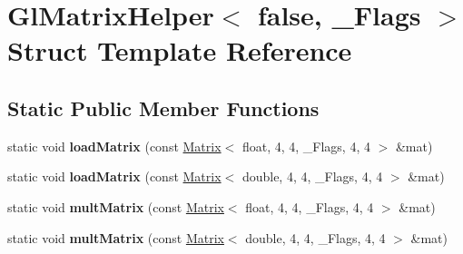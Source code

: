 \hypertarget{struct_gl_matrix_helper_3_01false_00_01___flags_01_4}{}\section{Gl\+Matrix\+Helper$<$ false, \+\_\+\+Flags $>$ Struct Template Reference}
\label{struct_gl_matrix_helper_3_01false_00_01___flags_01_4}
\subsection*{Static Public Member Functions}
\begin{DoxyCompactItemize}
\item 
\mbox{\label{struct_gl_matrix_helper_3_01false_00_01___flags_01_4_ad58e0d73dc539a670abd3812163ab128}} 
static void {\bfseries load\+Matrix} (const \hyperlink{group___core___module_class_eigen_1_1_matrix}{Matrix}$<$ float, 4, 4, \+\_\+\+Flags, 4, 4 $>$ \&mat)
\item 
\mbox{\label{struct_gl_matrix_helper_3_01false_00_01___flags_01_4_a7837d8a3fba513a90288f95579ef0dd9}} 
static void {\bfseries load\+Matrix} (const \hyperlink{group___core___module_class_eigen_1_1_matrix}{Matrix}$<$ double, 4, 4, \+\_\+\+Flags, 4, 4 $>$ \&mat)
\item 
\mbox{\label{struct_gl_matrix_helper_3_01false_00_01___flags_01_4_a68cee8cc7891123d546c06be2890e994}} 
static void {\bfseries mult\+Matrix} (const \hyperlink{group___core___module_class_eigen_1_1_matrix}{Matrix}$<$ float, 4, 4, \+\_\+\+Flags, 4, 4 $>$ \&mat)
\item 
\mbox{\label{struct_gl_matrix_helper_3_01false_00_01___flags_01_4_a32bb759b3d2bb2f973c37e40fc5b8785}} 
static void {\bfseries mult\+Matrix} (const \hyperlink{group___core___module_class_eigen_1_1_matrix}{Matrix}$<$ double, 4, 4, \+\_\+\+Flags, 4, 4 $>$ \&mat)
\item 
\mbox{\label{struct_gl_matrix_helper_3_01false_00_01___flags_01_4_ad58e0d73dc539a670abd3812163ab128}} 

\end{DoxyCompactItemize}
